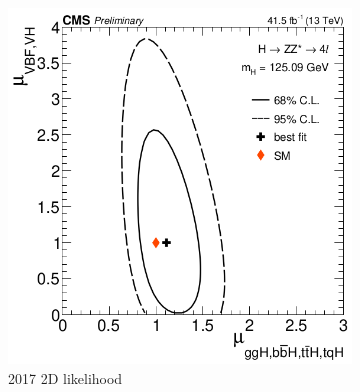 \begin{figure}[h]
\begin{subfigure}[b]{0.3\textwidth}
         \includegraphics[width=\textwidth]{images/2017ssmb.png}
         \caption{2017 2D likelihood}
     \end{subfigure}
      \hfill
     \begin{subfigure}[b]{0.3\textwidth}
        

\end{subfigure}
\end{figure}
